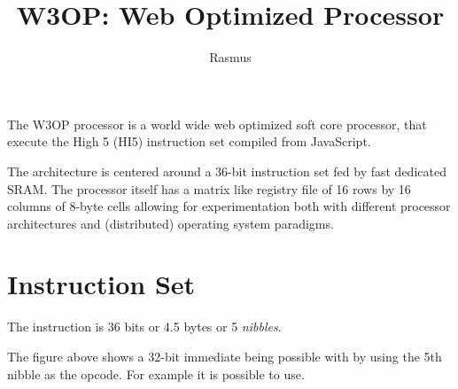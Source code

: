 \documentclass[10pt,a4paper]{article}
\title{W3OP: Web Optimized Processor}
\author{Rasmus}
\begin{document}
\maketitle

The W3OP processor is a world wide web optimized soft core processor, that execute the High 5 (HI5) instruction set compiled from JavaScript.

The architecture is centered around a 36-bit instruction set fed by fast dedicated SRAM. The processor itself has a matrix like registry file of 16 rows by 16 columns of 8-byte cells allowing for experimentation both with different processor architectures and (distributed) operating system paradigms.

\section{Instruction Set}
The instruction is 36 bits or 4.5 bytes or 5 {\it nibbles}.


The figure above shows a 32-bit immediate being possible with by using the 5th nibble as the opcode. For example it is possible to use.
\end{document}
